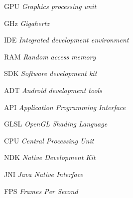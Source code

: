 \begin{siglas}
  \item[GPU] \textit{Graphics processing unit}
  \item[GHz] \textit{Gigahertz}
  \item[IDE] \textit{Integrated development environment}
  \item[RAM] \textit{Random access memory}
  \item[SDK] \textit{Software development kit}
  \item[ADT] \textit{Android development tools}
  \item[API] \textit{Application Programming Interface}
  \item[GLSL] \textit{OpenGL Shading Language}
  \item[CPU] \textit{Central Processing Unit}
  \item[NDK] \textit{Native Development Kit}
  \item[JNI] \textit{Java Native Interface}	
  \item[FPS] \textit{Frames Per Second}	


\end{siglas}
